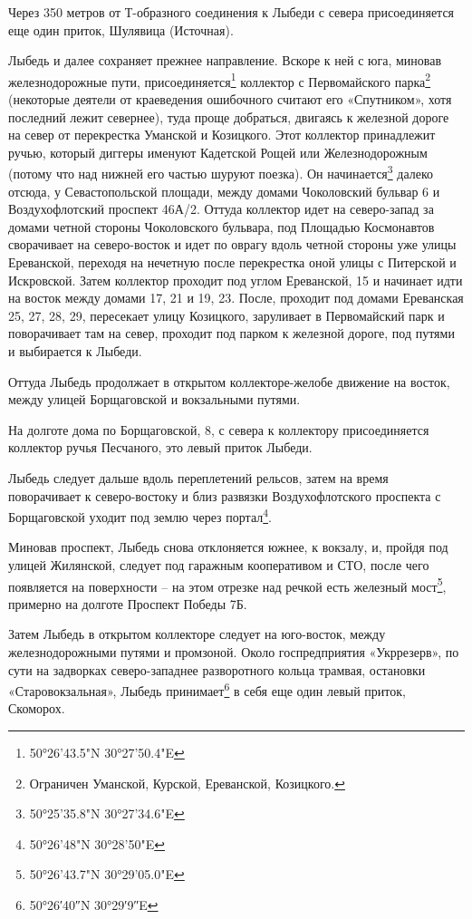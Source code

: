 Через 350 метров от Т-образного соединения к Лыбеди с севера присоединяется еще один приток, Шулявица (Источная).

Лыбедь и далее сохраняет прежнее направление. Вскоре к ней с юга, миновав железнодорожные пути, присоединяется\footnote{50°26'43.5"N 30°27'50.4"E} коллектор с Первомайского парка\footnote{Ограничен Уманской, Курской, Ереванской, Козицкого.} (некоторые деятели от краеведения ошибочного считают его «Спутником», хотя последний лежит севернее), туда проще добраться, двигаясь к железной дороге на север от перекрестка Уманской и Козицкого. Этот коллектор принадлежит ручью, который диггеры именуют Кадетской Рощей или Железнодорожным (потому что над нижней его частью шуруют поезка). Он начинается\footnote{50°25'35.8"N 30°27'34.6"E} далеко отсюда, у Севастопольской площади, между домами Чоколовский бульвар 6 и Воздухофлотский проспект 46А/2. Оттуда коллектор идет на северо-запад за домами четной стороны Чоколовского бульвара, под Площадью Космонавтов сворачивает на северо-восток и идет по оврагу вдоль четной стороны уже улицы Ереванской, переходя на нечетную после перекрестка оной улицы с Питерской и Искровской. Затем коллектор проходит под углом Ереванской, 15 и начинает идти на восток между домами 17, 21 и 19, 23. После, проходит под домами Ереванская 25, 27, 28, 29, пересекает улицу Козицкого, заруливает в Первомайский парк и поворачивает там на север, проходит под парком к железной дороге, под путями и выбирается к Лыбеди.

Оттуда Лыбедь продолжает в открытом кол\-лекторе-желобе движение на восток, между улицей Борщаговской и вокзальными путями.

На долготе дома по Борщаговской, 8, с севера к коллектору присоединяется коллектор ручья Песчаного, это левый приток Лыбеди.

Лыбедь следует дальше вдоль переплетений рельсов, затем на время поворачивает к северо-востоку и близ развязки Воздухофлотского проспекта с Борщаговской уходит под землю через портал\footnote{50°26'48"N 30°28'50"E}.

Миновав проспект, Лыбедь снова отклоняется южнее, к вокзалу, и, пройдя под улицей Жилянской, следует под гаражным кооперативом и СТО, после чего появляется на поверхности – на этом отрезке над речкой есть железный мост\footnote{50°26'43.7"N 30°29'05.0"E}, примерно на долготе Проспект Победы 7Б.

Затем Лыбедь в открытом коллекторе следует на юго-восток, между железнодорожными путями и промзоной. Около госпредприятия «Укррезерв», по сути на задворках северо-западнее разворотного кольца трамвая, остановки «Старовокзальная», Лыбедь принимает\footnote{50°26′40″N 30°29′9″E} в себя еще один левый приток, Скоморох.

